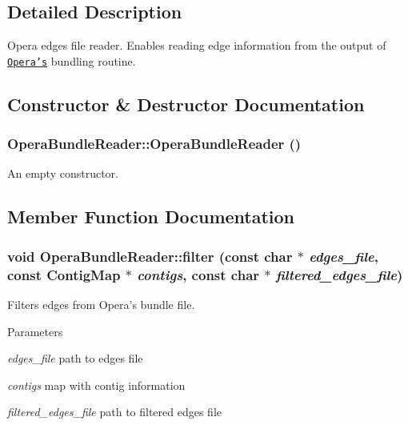\subsection{Detailed Description}
Opera edges file reader. Enables reading edge information from the output of \href{http://sourceforge.net/projects/operasf/}{\tt Opera's} bundling routine. 

\subsection{Constructor \& Destructor Documentation}
\hypertarget{classOperaBundleReader_aaaaa61f53cb7bf436f187d3c6f1e8dc1}{
\subsubsection[{OperaBundleReader}]{\setlength{\rightskip}{0pt plus 5cm}OperaBundleReader::OperaBundleReader ()}}
\label{classOperaBundleReader_aaaaa61f53cb7bf436f187d3c6f1e8dc1}
An empty constructor. 

\subsection{Member Function Documentation}
\hypertarget{classOperaBundleReader_a822e6a9b0ce2d1dd9353a692f328cac6}{
\subsubsection[{filter}]{\setlength{\rightskip}{0pt plus 5cm}void OperaBundleReader::filter (const char $\ast$ {\em edges\_\-file}, \/  const {\bf ContigMap} $\ast$ {\em contigs}, \/  const char $\ast$ {\em filtered\_\-edges\_\-file})}}
\label{classOperaBundleReader_a822e6a9b0ce2d1dd9353a692f328cac6}


Filters edges from Opera's bundle file. 
\begin{DoxyParams}{Parameters}
\item[{\em edges\_\-file}]path to edges file \item[{\em contigs}]map with contig information \item[{\em filtered\_\-edges\_\-file}]path to filtered edges file \end{DoxyParams}
 

